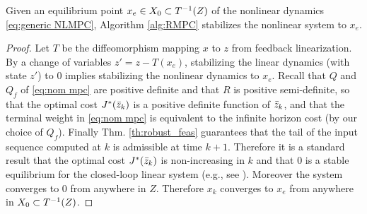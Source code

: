 
\begin{theorem}[Stability]
	\label{thm:stability}
Given an equilibrium point $x_e \in X_0 \subset T^{-1}(Z)$ of the nonlinear dynamics \eqref{eq:generic NLMPC}, Algorithm \ref{alg:RMPC} stabilizes the nonlinear system to $x_e$.
\end{theorem}

\begin{proof}
Let $T$ be the diffeomorphism mapping $x$ to $z$ from feedback linearization.
By a change of variables $z' = z - T(x_e)$, stabilizing the linear dynamics (with state $z'$) to 0 implies stabilizing the nonlinear dynamics to $x_e$.
Recall that $Q$ and $Q_f$ of  \eqref{eq:nom mpc} are positive definite and that $R$ is positive semi-definite,  so that the optimal cost $J^*(\bar{z}_{k})$ is a positive definite function of $\bar{z}_{k}$, and that the terminal weight in \eqref{eq:nom mpc} is equivalent to the infinite horizon cost (by our choice of $Q_f$). 
Finally Thm.  \ref{th:robust_feas} guarantees that the tail of the input sequence computed at $k$ is admissible at time $k+1$. 
Therefore it is a standard result that the optimal cost $J^{*}({\bar{z}}_{k})$ is non-increasing in $k$ and that $0$ is a stable equilibrium for the closed-loop linear system (e.g., see \cite{CannonK15MPC} ). 
Moreover the system converges to 0 from anywhere in $Z$.
Therefore $x_k$ converges to $x_e$ from anywhere in $X_0 \subset T^{-1}(Z)$.
\end{proof}